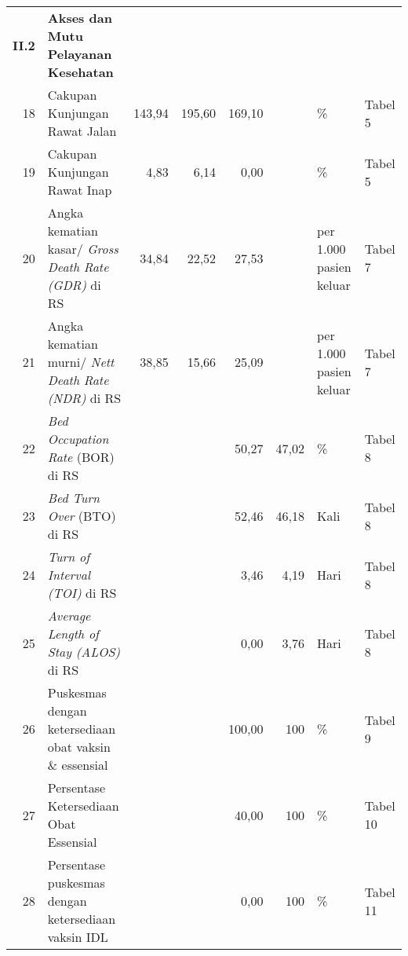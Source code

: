 \begin{small}
\begin{longtable}{rY{12em}rrrrY{5em}Y{5em}}
    \textbf{II.2} & \textbf{Akses dan Mutu Pelayanan Kesehatan}                       &        &        &                    &          &                                &          \\
	 18 & Cakupan Kunjungan Rawat Jalan                                               &         143,94 & 195,60 &       169,10 &          & \%                             & Tabel 5  \\
	 19 & Cakupan Kunjungan Rawat Inap                                                &           4,83 &   6,14 &         0,00 &          & \%                             & Tabel 5  \\
	 20 & Angka kematian kasar/ \emph{Gross Death Rate (GDR)} di RS                   &          34,84 &  22,52 &        27,53 &          & per 1.000 pasien keluar        & Tabel 7  \\
	 21 & Angka kematian murni/ \emph{Nett Death Rate (NDR)} di RS                    &          38,85 &  15,66 &        25,09 &          & per 1.000 pasien keluar        & Tabel 7  \\
	 22 & \emph{Bed Occupation Rate} (BOR) di RS                                      &                &        &        50,27 &    47,02 & \%                             & Tabel 8  \\
	 23 & \emph{Bed Turn Over} (BTO) di RS                                            &                &        &        52,46 &    46,18 & Kali                           & Tabel 8  \\
	 24 & \emph{Turn of Interval (TOI)} di RS                                         &                &        &         3,46 &     4,19 & Hari                           & Tabel 8  \\
	 25 & \emph{Average Length of Stay (ALOS)} di RS                                  &                &        &         0,00 &     3,76 & Hari                           & Tabel 8  \\
	 26 & Puskesmas dengan ketersediaan obat vaksin \& essensial                      &                &        &       100,00 &      100 & \%                             & Tabel 9  \\
	 27 & Persentase Ketersediaan Obat Essensial                                      &                &        &        40,00 &      100 & \%                             & Tabel 10 \\
	 28 & Persentase puskesmas dengan ketersediaan vaksin IDL                         &                &        &         0,00 &      100 & \%                             & Tabel 11 \\

\end{longtable}
\end{small}
